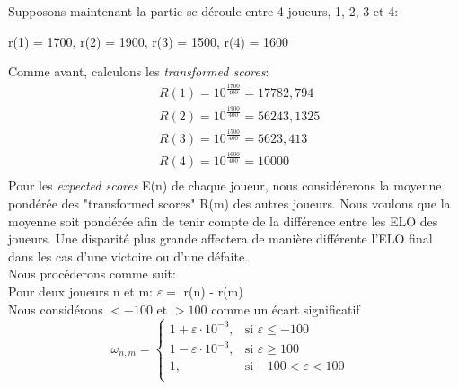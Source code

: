     Supposons maintenant la partie se déroule entre 4 joueurs, 1, 2, 3 et 4:
    \begin{center}
        r(1) = 1700, r(2) = 1900, r(3) = 1500, r(4) = 1600
    \end{center}
    Comme avant, calculons les \textit{transformed scores}:
        \begin{equation}
            \begin{split}
                & R(1) = 10^{\frac{1700}{400}} = 17782,794 \\
                & R(2) = 10^{\frac{1900}{400}} = 56243,1325 \\
                & R(3) = 10^{\frac{1500}{400}} = 5623, 413  \\
                & R(4) = 10^{\frac{1600}{400}} = 10000 \\
            \end{split}
        \end{equation}
        Pour les \textit{expected scores} E(n) de chaque joueur, nous considérerons la moyenne pondérée des "transformed scores" R(m) des autres joueurs.
        Nous voulons que la moyenne soit pondérée afin de tenir compte de la différence entre les ELO des joueurs. Une disparité plus grande affectera
        de manière différente l'ELO final dans les cas d'une victoire ou d'une défaite.  \\
        Nous procéderons comme suit: \\
        Pour deux joueurs n et m: $\varepsilon = $ r(n) - r(m)  \\
        Nous considérons $< -100 \text{ et } > 100$ comme un écart significatif
            $$ \omega_{n, m} =
            \begin{cases}
                1 + \varepsilon \cdot 10^{-3}, & \text{si $\varepsilon \le -100$} \\
                1 - \varepsilon \cdot 10^{-3}, & \text{si $\varepsilon \ge 100$} \\
                1, & \text{si $-100 < \varepsilon < 100$ }\\
            \end{cases} $$
        
